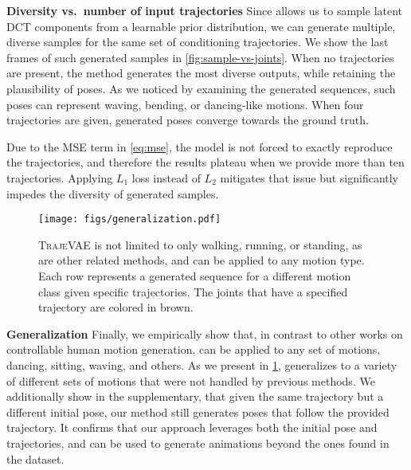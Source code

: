 \documentclass[10pt,twocolumn,letterpaper]{article}
\renewcommand{\paragraph}[1]{\noindent\textbf{#1}\enskip}
\begin{document}
\paragraph{Diversity vs.~number of input trajectories} Since \trajevae{} allows us to sample latent DCT components from a learnable prior distribution, we can generate multiple, diverse samples for the same set of conditioning trajectories. We show the last frames of such generated samples in \cref{fig:sample-vs-joints}. When no trajectories are present, the method generates the most diverse outputs, while retaining the plausibility of poses. As we noticed by examining the generated sequences, such poses can represent waving, bending, or dancing-like motions. When four trajectories are given, generated poses converge towards the ground truth. 

Due to the MSE term in \cref{eq:mse}, the model is not forced to exactly reproduce the trajectories, and therefore the results plateau when we provide more than ten trajectories. Applying $L_1$ loss instead of $L_2$ mitigates that issue but significantly impedes the diversity of generated samples.


\begin{figure}[t!]
    \centering
    \texttt{[image: figs/generalization.pdf]}
    \caption{\textsc{TrajeVAE} is not limited to only walking, running, or standing, as are other related methods, and can be applied to any motion type. Each row represents a generated sequence for a different motion class given specific trajectories. The joints that have a specified trajectory are colored in brown.}
    \label{fig:generalization}
\end{figure}

\paragraph{Generalization} Finally, we empirically show that, in contrast to other works on controllable human motion generation, \trajevae{} can be applied to any set of motions, \eg dancing, sitting, waving, and others. As we present in \cref{fig:generalization}, \trajevae{} generalizes to a variety of different sets of motions that were not handled by previous methods. We additionally show in the supplementary, that given the same trajectory but a different initial pose, our method still generates poses that follow the provided trajectory. It confirms that our approach leverages both the initial pose and trajectories, and can be used to generate animations beyond the ones found in the dataset.
\end{document}
